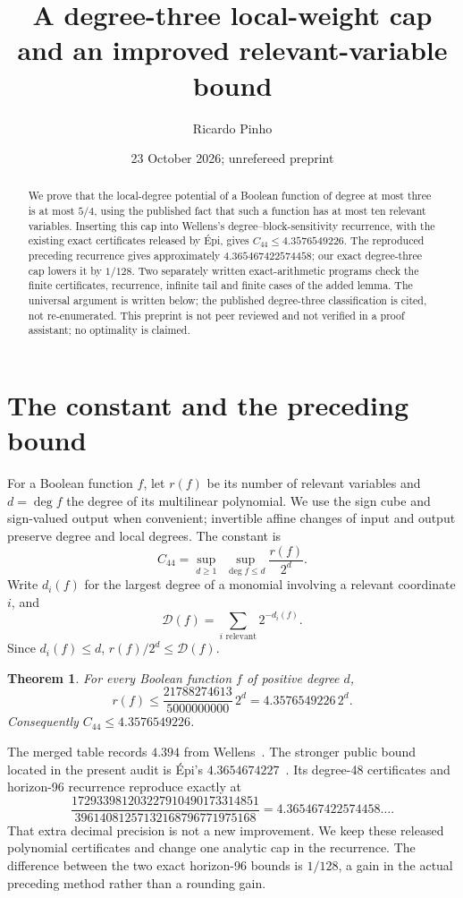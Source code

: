 \documentclass[11pt]{amsart}
\title[A local-degree cap]{A degree-three local-weight cap and an improved relevant-variable bound}
\author{Ricardo Pinho}
\date{23 October 2026; unrefereed preprint}
\newtheorem{theorem}{Theorem}
\newcommand{\D}{\mathcal D}
\begin{document}
\begin{abstract}
We prove that the local-degree potential of a Boolean function of degree
at most three is at most $5/4$, using the published fact that such a
function has at most ten relevant variables. Inserting this cap into
Wellens's degree--block-sensitivity recurrence, with the existing exact
certificates released by \texorpdfstring{\'Epi}{Epi}, gives
$C_{44}\le4.3576549226$.
The reproduced preceding recurrence gives approximately $4.365467422574458$;
our exact degree-three cap lowers it by $1/128$.
Two separately written exact-arithmetic programs check the finite
certificates, recurrence, infinite tail and finite cases of the added lemma.
The universal argument is written below; the published degree-three
classification is cited, not re-enumerated. This preprint is not peer
reviewed and not verified in a proof assistant; no optimality is claimed.
\end{abstract}
\maketitle

\section{The constant and the preceding bound}
For a Boolean function $f$, let $r(f)$ be its number of relevant variables
and $d=\deg f$ the degree of its multilinear polynomial. We use the sign
cube and sign-valued output when convenient; invertible affine changes of
input and output preserve degree and local degrees. The constant is
\[
 C_{44}=\sup_{d\ge1}\ \sup_{\deg f\le d}\frac{r(f)}{2^d}.
\]
Write $d_i(f)$ for the largest degree of a monomial involving a relevant
coordinate $i$, and
\[
 \D(f)=\sum_{i\text{ relevant}}2^{-d_i(f)}.
\]
Since $d_i(f)\le d$, $r(f)/2^d\le\D(f)$.

\begin{theorem}\label{main}
For every Boolean function $f$ of positive degree $d$,
\[
 r(f)\le \frac{21788274613}{5000000000}\,2^d
       =4.3576549226\,2^d.
\]
Consequently $C_{44}\le4.3576549226$.
\end{theorem}

The merged table records $4.394$ from Wellens~\cite{wellens,table}.
The stronger public bound located in the present audit is \'Epi's
$4.3654674227$~\cite{epi,epipaper}. Its degree-48 certificates and
horizon-96 recurrence reproduce exactly at
\[
 \frac{172933981203227910490173314851}
      {39614081257132168796771975168}
 =4.365467422574458\ldots.
\]
That extra decimal precision is not a new improvement. We keep these
released polynomial certificates and change one analytic cap in the
recurrence. The difference between the two exact horizon-96 bounds is
$1/128$, a gain in the actual preceding method rather than a rounding gain.
\end{document}
